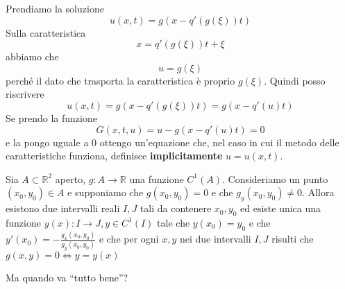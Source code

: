 \documentclass[10pt,a4paper,twoside,openright]{book}
\begin{document}
Prendiamo la soluzione
\begin{equation*}
    u(x,t) =g(x-q'(g(\xi)) t)
\end{equation*}
Sulla caratteristica
\begin{equation*}
    x=q'(g(\xi))t +\xi
\end{equation*}
abbiamo che
\begin{equation*}
    u=g(\xi)
\end{equation*}
perché il dato che trasporta la caratteristica è proprio $\displaystyle g(\xi)$. Quindi posso riscrivere
\begin{equation*}
    u(x,t) =g(x-q'(g(\xi)) t) =g(x-q'(u) t)
\end{equation*}
Se prendo la funzione
\begin{equation*}
    G(x,t,u) =u-g(x-q'(u) t) =0
\end{equation*}
e la pongo uguale a $0$ ottengo un'equazione che, nel caso in cui il metodo delle caratteristiche funziona, definisce \textbf{implicitamente} $\displaystyle u=u(x,t)$.

\begin{theorem}
     Sia $A\subset \mathbb{R}^2$ aperto, $g:A\to \mathbb{R} $ una funzione $C^{1}(A) $. Consideriamo un punto $(x_{0},y_{0})\in A$ e supponiamo che $g(x_{0},y_{0})=0$ e che $g_{y}(x_{0},y_{0})\neq 0$. Allora esistono due intervalli reali $I,J$ tali da contenere $x_{0},y_{0}$ ed esiste unica una funzione $y(x):I\to J, y\in C^{1}(I) $ tale che $y(x_{0})=y_{0}$ e che $y'(x_{0})=-\frac{g_{x}(x_{0},y_{0})}{g_{y}(x_{0},y_{0})}$ e che per ogni $x,y$ nei due intervalli $I,J$ risulti che $g(x,y)=0 \Leftrightarrow y=y(x)$
\end{theorem}

Ma quando va ``tutto bene''?
\end{document}
